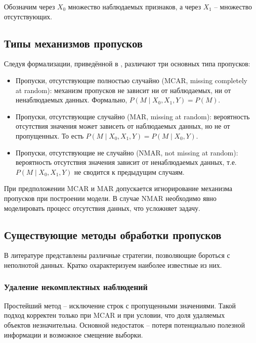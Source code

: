 Обозначим через \(X_0\) множество наблюдаемых признаков, а через \(X_1\) -- множество отсутствующих.

\subsection{Типы механизмов пропусков}

Следуя формализации, приведённой в \cite{little1995statistical}, различают три основных типа пропусков:

\begin{itemize}
    \item Пропуски, отсутствующие полностью случайно (MCAR, missing completely at random): механизм пропусков не зависит ни от наблюдаемых, ни от ненаблюдаемых данных. Формально, \(P(M \mid X_0, X_1, Y) = P(M)\).
    \item Пропуски, отсутствующие случайно (MAR, missing at random): вероятность отсутствия значения может зависеть от наблюдаемых данных, но не от пропущенных. То есть \(P(M \mid X_0, X_1, Y) = P(M \mid X_0, Y)\).
    \item Пропуски, отсутствующие не случайно (NMAR, not missing at random): вероятность отсутствия значения зависит от ненаблюдаемых данных, т.е. \(P(M \mid X_0, X_1, Y)\) не сводится к предыдущим случаям.
\end{itemize}

При предположении MCAR и MAR допускается игнорирование механизма пропусков при построении модели. В случае NMAR необходимо явно моделировать процесс отсутствия данных, что усложняет задачу.

\subsection{Существующие методы обработки пропусков}

В литературе представлены различные стратегии, позволяющие бороться с неполнотой данных. Кратко охарактеризуем наиболее известные из них.

\subsubsection{Удаление некомплектных наблюдений}

Простейший метод -- исключение строк с пропущенными значениями. Такой подход корректен только при MCAR и при условии, что доля удаляемых объектов незначительна. Основной недостаток -- потеря потенциально полезной информации и возможное смещение выборки.


